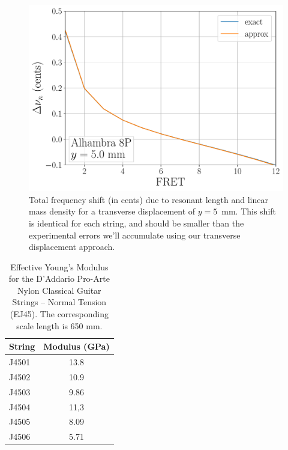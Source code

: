  \begin{figure}
  \centering
  \includegraphics[width=5.0in]{figures/quad_shift_factory}
  \caption{\label{fig:quad_shift_factory} Total frequency shift (in cents) due to resonant length and linear mass density for a transverse displacement of $y = 5$~mm. This shift is identical for each string, and should be smaller than the experimental errors we'll accumulate using our transverse displacement approach.}
 \end{figure}

\begin{table}%
  \centering
  \caption{\label{tbl:ej45_mod} Effective Young's Modulus for the D'Addario Pro-Arte Nylon Classical Guitar Strings -- Normal Tension (EJ45). The corresponding scale length is 650 mm. }
    \begin{tabular}{lc}
    \hline \hline
    String  & \multicolumn{1}{l}{Modulus (GPa)} \\
    \hline
    J4501 & 13.8 \\
    J4502 & 10.9 \\
    J4503 & 9.86 \\
    J4504 & 11,3 \\
    J4505 & 8.09 \\
    J4506 & 5.71 \\
    \hline
    \end{tabular}%
  \label{tab:addlabel}%
\end{table}%

